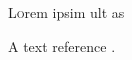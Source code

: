 \lettrine[nindent=0em,lines=3]{L}orem ipsim ult as
\blindtext %

\blindtext %

A text reference \cite{L}.

\blindtext %

